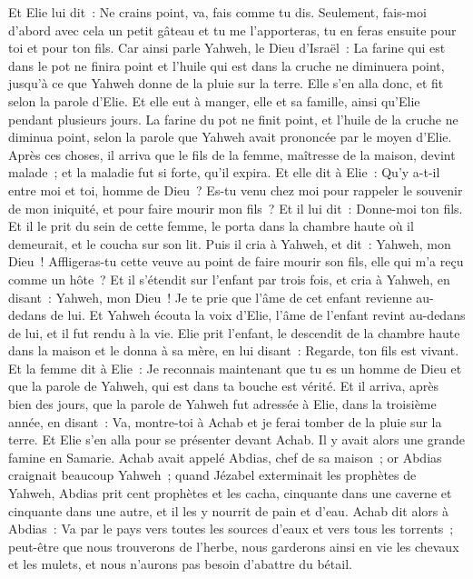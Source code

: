 \begin{multicols}{2}
Et Elie lui dit~: Ne crains point, va, fais comme tu dis. Seulement, fais-moi d'abord avec cela un petit gâteau et tu me l'apporteras, tu en feras ensuite pour toi et pour ton fils.
Car ainsi parle Yahweh, le Dieu d'Israël~: La farine qui est dans le pot ne finira point et l'huile qui est dans la cruche ne diminuera point, jusqu'à ce que Yahweh donne de la pluie sur la terre.
Elle s'en alla donc, et fit selon la parole d'Elie. Et elle eut à manger, elle et sa famille, ainsi qu'Elie pendant plusieurs jours.
La farine du pot ne finit point, et l'huile de la cruche ne diminua point, selon la parole que Yahweh avait prononcée par le moyen d'Elie.
Après ces choses, il arriva que le fils de la femme, maîtresse de la maison, devint malade~; et la maladie fut si forte, qu'il expira.
Et elle dit à Elie~: Qu'y a-t-il entre moi et toi, homme de Dieu~? Es-tu venu chez moi pour rappeler le souvenir de mon iniquité, et pour faire mourir mon fils~?
Et il lui dit~: Donne-moi ton fils. Et il le prit du sein de cette femme, le porta dans la chambre haute où il demeurait, et le coucha sur son lit.
Puis il cria à Yahweh, et dit~: Yahweh, mon Dieu~! Affligeras-tu cette veuve au point de faire mourir son fils, elle qui m'a reçu comme un hôte~?
Et il s'étendit sur l'enfant par trois fois, et cria à Yahweh, en disant~: Yahweh, mon Dieu~! Je te prie que l'âme de cet enfant revienne au-dedans de lui.
Et Yahweh écouta la voix d'Elie, l'âme de l'enfant revint au-dedans de lui, et il fut rendu à la vie.
Elie prit l'enfant, le descendit de la chambre haute dans la maison et le donna à sa mère, en lui disant~: Regarde, ton fils est vivant.
Et la femme dit à Elie~: Je reconnais maintenant que tu es un homme de Dieu et que la parole de Yahweh, qui est dans ta bouche est vérité.
\VerseOne{}Et il arriva, après bien des jours, que la parole de Yahweh fut adressée à Elie, dans la troisième année, en disant~: Va, montre-toi à Achab et je ferai tomber de la pluie sur la terre.
Et Elie s'en alla pour se présenter devant Achab. Il y avait alors une grande famine en Samarie.
Achab avait appelé Abdias, chef de sa maison~; or Abdias craignait beaucoup Yahweh~;
quand Jézabel exterminait les prophètes de Yahweh, Abdias prit cent prophètes et les cacha, cinquante dans une caverne et cinquante dans une autre, et il les y nourrit de pain et d'eau.
Achab dit alors à Abdias~: Va par le pays vers toutes les sources d'eaux et vers tous les torrents~; peut-être que nous trouverons de l'herbe, nous garderons ainsi en vie les chevaux et les mulets, et nous n'aurons pas besoin d'abattre du bétail.

\end{multicols}
